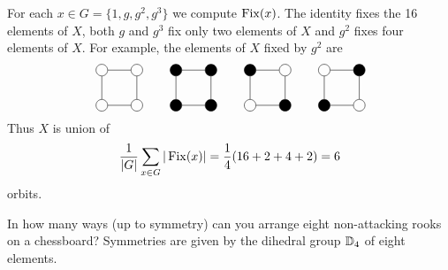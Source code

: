 \begin{example}
For each $x\in G=\{1,g,g^2,g^3\}$ we compute $\operatorname{Fix}(x)$. The identity fixes 
the 16 elements of $X$, both 
$g$ and  $g^3$ fix only two elements of $X$ and 
$g^2$ fixes four elements of $X$. For example, 
the elements of $X$ fixed by $g^2$ are 
\[
\begin{tikzpicture}
    \node[shape=circle,draw=black] (A) at (1,0){};
    \node[shape=circle,draw=black] (B) at (1,1){};
    \node[shape=circle,draw=black] (C) at (0,1){}; 
    \node[shape=circle,draw=black] (D) at (0,0){};
    \path [-](A) edge node[left]{} (B);
    \path [-](B) edge node[left]{} (C);
    \path [-](C) edge node[left]{} (D);
    \path [-](D) edge node[left]{} (A);
\end{tikzpicture}
\qquad
\begin{tikzpicture}
    \node[shape=circle,draw=black,fill=black] (A) at (1,0) {};
    \node[shape=circle,draw=black,fill=black] (B) at (1,1) {};
    \node[shape=circle,draw=black,fill=black] (C) at (0,1) {};
    \node[shape=circle,draw=black,fill=black] (D) at (0,0) {};
    \path [-](A) edge node[left]{} (B);
    \path [-](B) edge node[left]{} (C);
    \path [-](C) edge node[left]{} (D);
    \path [-](D) edge node[left]{} (A);
\end{tikzpicture}
\qquad
\begin{tikzpicture}
    \node[shape=circle,draw=black,fill=black] (A) at (1,0) {};
    \node[shape=circle,draw=black] (B) at (1,1) {};
    \node[shape=circle,draw=black,fill=black] (C) at (0,1) {};
    \node[shape=circle,draw=black] (D) at (0,0) {};
    \path [-](A) edge node[left]{} (B);
    \path [-](B) edge node[left]{} (C);
    \path [-](C) edge node[left]{} (D);
    \path [-](D) edge node[left]{} (A);
\end{tikzpicture}
\qquad
\begin{tikzpicture}
    \node[shape=circle,draw=black] (A) at (1,0) {};
    \node[shape=circle,draw=black,fill=black] (B) at (1,1) {};
    \node[shape=circle,draw=black] (C) at (0,1) {};
    \node[shape=circle,draw=black,fill=black] (D) at (0,0) {};
    \path [-](A) edge node[left]{} (B);
    \path [-](B) edge node[left]{} (C);
    \path [-](C) edge node[left]{} (D);
    \path [-](D) edge node[left]{} (A);
\end{tikzpicture}
\]
Thus $X$ is union of  
\[
\frac{1}{|G|}\sum_{x\in G}|\operatorname{Fix}(x)|=\frac{1}{4}(16+2+4+2)=6
\]
orbits. 
\end{example}

\begin{exercise}
    In how many ways (up to symmetry) can you
    arrange eight non-attacking rooks on a chessboard? Symmetries 
    are given by the dihedral group $\mathbb{D}_4$ of eight elements.
\end{exercise}

